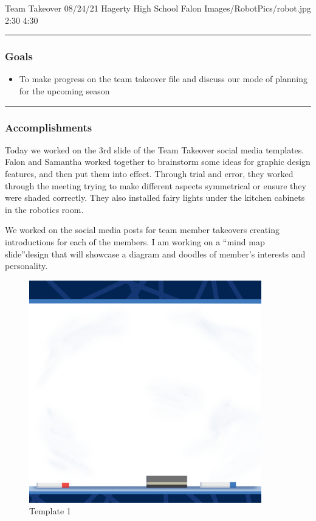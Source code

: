 \insertmeeting 
	{Team Takeover} 
	{08/24/21}
	{Hagerty High School}
	{Falon}
	{Images/RobotPics/robot.jpg}
	{2:30}
 	{4:30}
	
\noindent\hfil\rule{\textwidth}{.4pt}\hfil
\subsubsection*{Goals}
\begin{itemize}
    \item To make progress on the team takeover file and discuss our mode of planning for the upcoming season
  

\end{itemize} 

\noindent\hfil\rule{\textwidth}{.4pt}\hfil

\subsubsection*{Accomplishments}
Today we worked on the 3rd slide of the Team Takeover social media templates. Falon and Samantha worked together to brainstorm some ideas for graphic design features, and then put them into effect. Through trial and error, they worked through the meeting trying to make different aspects symmetrical or ensure they were shaded correctly. They also installed fairy lights under the kitchen cabinets in the robotics room.

We worked on the social media posts for team member takeovers creating introductions for each of the members. I am working on a “mind map slide”design that will showcase a diagram and doodles of member’s interests and personality. 

\begin{figure}[htp]
\centering
\includegraphics[width=0.9\textwidth, angle=0]{Meetings/August/08-24-21/1.PNG}
\caption{Template 1}
\label{fig:082421_1}
\end{figure}


